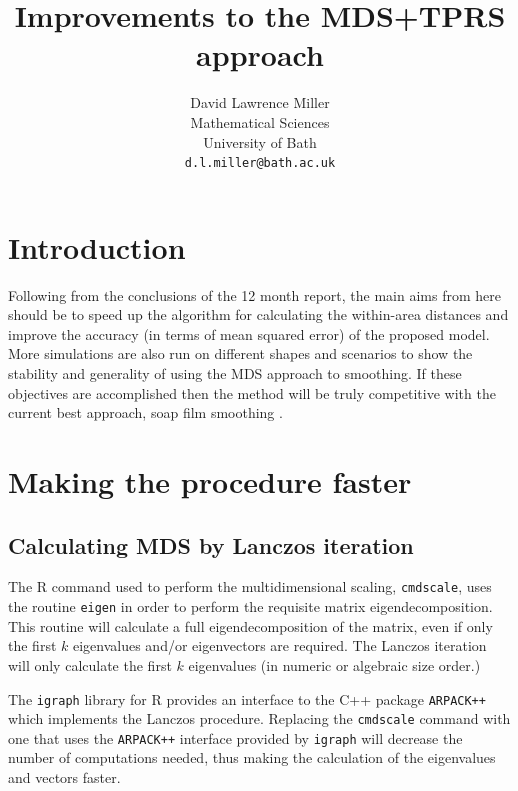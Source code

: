 \documentclass[a4paper,10pt]{article}
\title{Improvements to the MDS+TPRS approach}
\author{David Lawrence Miller\\Mathematical Sciences\\University of Bath\\\texttt{d.l.miller@bath.ac.uk}}
\begin{document}
 
 
 
\newtheorem{thm}{Theorem}[section]
 
\newtheorem{defn}{Definition}[section]
 
\maketitle

\section{Introduction}

Following from the conclusions of the 12 month report, the main aims from here should be to speed up the algorithm for calculating the within-area distances and improve the accuracy (in terms of mean squared error) of the proposed model. More simulations are also run on different shapes and scenarios to show the stability and generality of using the MDS approach to smoothing. If these objectives are accomplished then the method will be truly competitive with the current best approach, soap film smoothing \cite{soap}.


\section{Making the procedure faster}

\subsection{Calculating MDS by Lanczos iteration}

The \textsf{R} command used to perform the multidimensional scaling, \texttt{cmdscale}, uses the routine \texttt{eigen} in order to perform the requisite matrix eigendecomposition. This routine will calculate a full eigendecomposition of the matrix, even if only the first $k$ eigenvalues and/or eigenvectors are required. The Lanczos iteration will only calculate the first $k$ eigenvalues (in numeric or algebraic size order.)

The \texttt{igraph} library for \textsf{R} provides an interface to the C++ package \texttt{ARPACK++} which implements the Lanczos procedure. Replacing the \texttt{cmdscale} command with one that uses the \texttt{ARPACK++} interface provided by \texttt{igraph} will decrease the number of computations needed, thus making the calculation of the eigenvalues and vectors faster.
\end{document}

